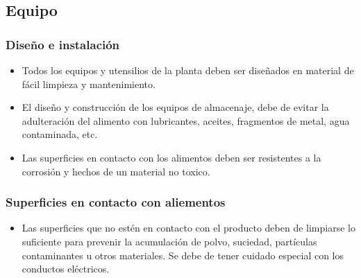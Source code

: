 \subsection{Equipo}

\subsubsection{Diseño e instalación}
\begin{itemize}
	\item Todos los equipos y utensilios de la planta deben ser diseñados en material de fácil limpieza y mantenimiento.
	\item El diseño y construcción de los equipos de almacenaje, debe de evitar la adulteración del alimento con lubricantes, aceites, fragmentos de metal, agua contaminada, etc.
	\item Las superficies en contacto con los alimentos deben ser resistentes a la corrosión y hechos de un material no toxico.
\end{itemize}

\subsubsection{Superficies en contacto con aliementos}
\begin{itemize}
	\item Las superficies que no estén en contacto con el producto deben de limpiarse lo suficiente para prevenir la acumulación de polvo, suciedad, partículas contaminantes u otros materiales. Se debe de tener cuidado especial con los conductos eléctricos.
\end{itemize}

